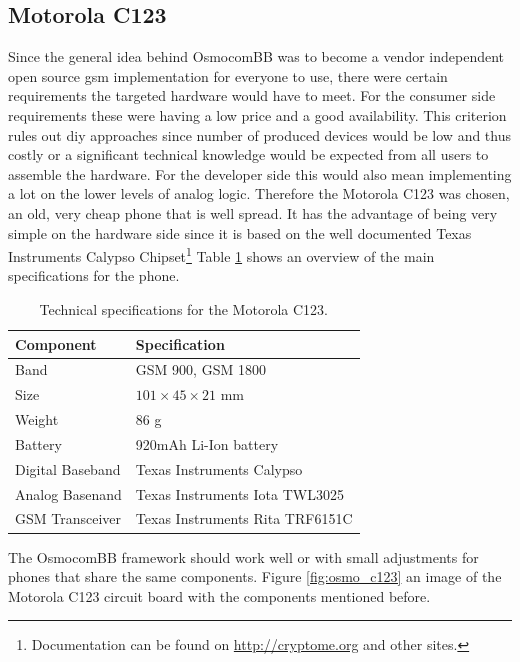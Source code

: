 \subsection{Motorola C123}
\label{sec:osmo_phones}
Since the general idea behind OsmocomBB was to become a vendor independent open source \gls{gsm} implementation for everyone to use, there were certain requirements the targeted hardware would have to meet.
For the consumer side requirements these were having a low price and a good availability.
This criterion rules out \gls{diy} approaches since number of produced devices would be low and thus costly or a significant technical knowledge would be expected from all users to assemble the hardware.
For the developer side this would also mean implementing a lot on the lower levels of analog logic.
Therefore the Motorola C123 was chosen, an old, very cheap phone that is well spread.
It has the advantage of being very simple on the hardware side since it is based on the well documented Texas Instruments Calypso Chipset\footnote{Documentation can be found on \url{http://cryptome.org} and other sites.}
Table \ref{tab:c123_specs} shows an overview of the main specifications for the phone.
\begin{table}
\centering
	\begin{tabular}{ll}
	\toprule
	Component			&Specification\\
	\midrule
	Band 				&GSM 900, GSM 1800\\
	Size				&$101\times 45\times 21$ mm\\
	Weight				&86 g\\
	Battery				&920mAh Li-Ion battery\\
	Digital Baseband	&Texas Instruments Calypso\\
	Analog Basenand		&Texas Instruments Iota TWL3025\\
	GSM Transceiver		&Texas Instruments Rita TRF6151C\\
	\bottomrule
	\end{tabular}
	\caption{Technical specifications for the Motorola C123.}
	\label{tab:c123_specs}
\end{table}
The OsmocomBB framework should work well or with small adjustments for phones that share the same components.
Figure \ref{fig:osmo_c123} an image of the Motorola C123 circuit board with the components mentioned before.
